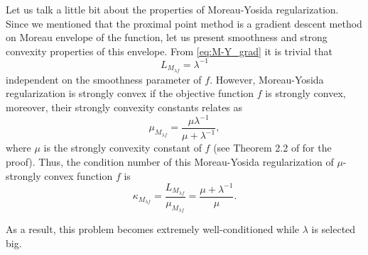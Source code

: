 {Let us talk a little bit about the properties of Moreau-Yosida regularization. Since we mentioned that the proximal point method is a gradient descent method on Moreau envelope of the function, let us present smoothness and strong convexity properties of this envelope. From \eqref{eq:M-Y_grad} it is trivial that 
\begin{equation}\label{eq:M-Y_smoothness}
L_{M_{\lambda f}} = \lambda^{-1}
\end{equation}
independent on the smoothness parameter of $f$. However, Moreau-Yosida regularization is strongly convex if the objective function $f$ is strongly convex, moreover, their strongly convexity constants relates as
\begin{equation}\label{eq:M-Y_strongly}
\mu_{M_{\lambda f}} = \frac{\mu\lambda^{-1}}{\mu + \lambda^{-1}},
\end{equation}
where $\mu$ is the strongly convexity constant of $f$ (see Theorem 2.2 of \cite{lemarechal1997practical} for the proof). Thus, the condition number of this Moreau-Yosida regularization of $\mu$-strongly convex function $f$ is 
\begin{equation}\label{eq:M-Y_condition}
\kappa_{M_{\lambda f}} = \frac{L_{M_{\lambda f}}}{\mu_{M_{\lambda f}}} = \frac{\mu + \lambda^{-1}}{\mu}.
\end{equation}

As a result, this problem becomes extremely well-conditioned while $\lambda$ is selected big.






}

